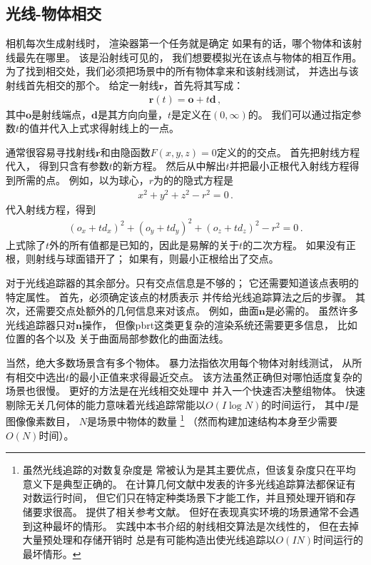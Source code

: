 \subsection{光线-物体相交}\label{sub:光线-物体相交}

相机每次生成射线时，
渲染器第一个任务就是确定
如果有的话，哪个物体和该射线最先在哪里。
该是沿射线可见的，
我们想要模拟光在该点与物体的相互作用。
为了找到相交处，我们必须把场景中的所有物体拿来和该射线测试，
并选出与该射线首先相交的那个。
给定一射线${\bm r}$，首先将其写成：
\begin{align*}
      {\bm r}(t)={\bm o}+t{\bm d}\, ,
\end{align*}
其中${\bm o}$是射线端点，${\bm d}$是其方向向量，$t$是定义在$(0,\infty)$的。
我们可以通过指定参数$t$的值并代入上式求得射线上的一点。

通常很容易寻找射线${\bm r}$和由隐函数$F(x,y,z)=0$定义的的交点。
首先把射线方程代入，
得到只含有参数$t$的新方程。
然后从中解出$t$并把最小正根代入射线方程得到所需的点。
例如，以为球心，$r$为的的隐式方程是
\begin{align*}
      x^2+y^2+z^2-r^2=0\, .
\end{align*}
代入射线方程，得到
\begin{align*}
      (o_x+td_x)^2+(o_y+td_y)^2+(o_z+td_z)^2-r^2=0\, .
\end{align*}
上式除了$t$外的所有值都是已知的，因此是易解的关于$t$的二次方程。
如果没有正根，则射线与球面错开了；
如果有，则最小正根给出了交点。

对于光线追踪器的其余部分。只有交点信息是不够的；
它还需要知道该点表明的特定属性。
首先，必须确定该点的材质表示
并传给光线追踪算法之后的步骤。
其次，还需要交点处额外的几何信息来对该点。
例如，曲面${\bm n}$是必需的。
虽然许多光线追踪器只对${\bm n}$操作，
但像pbrt这类更复杂的渲染系统还需要更多信息，
比如位置的各个以及
关于曲面局部参数化的曲面法线。

当然，绝大多数场景含有多个物体。
暴力法指依次用每个物体对射线测试，
从所有相交中选出$t$的最小正值来求得最近交点。
该方法虽然正确但对哪怕适度复杂的场景也很慢。
更好的方法是在光线相交处理中
并入一个快速否决整组物体。
快速剔除无关几何体的能力意味着光线追踪常能以$O(I\log{N})$的时间运行，
其中$I$是图像像素数目，
$N$是场景中物体的数量
\footnote{虽然光线追踪的对数复杂度是
      常被认为是其主要优点，但该复杂度只在平均意义下是典型正确的。
      在计算几何文献中发表的许多光线追踪算法都保证有对数运行时间，
      但它们只在特定种类场景下才能工作，并且预处理开销和存储要求很高。
      \protect\citet{10.1007/BF02684409}提供了相关参考文献。
      但好在表现真实环境的场景通常不会遇到这种最坏的情形。
      实践中本书介绍的射线相交算法是次线性的，
      但在去掉大量预处理和存储开销时
      总是有可能构造出使光线追踪以$O(IN)$时间运行的最坏情形。}
（然而构建加速结构本身至少需要$O(N)$时间）。

